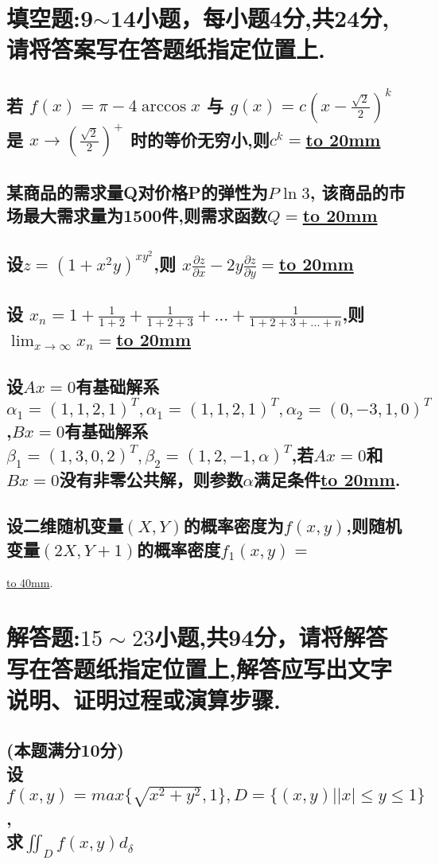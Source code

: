 \documentclass[utf8]{ctexart}
\begin{document}
\section{填空题:\textbf{9$\sim$14小题，每小题4分,共24分,请将答案写在答题纸指定位置上.}}
\subsection{
	若 $f(x)=\pi-4\arccos{x}$ 与 $g(x)=c\left(x-\frac{\sqrt{2}}{2}\right)^k$ 是 $x\rightarrow\left(\frac{\sqrt{2}}{2}\right)^+$ 时的等价无穷小,则$c^k=$\underline{\hbox to 20mm{}} 
}

\subsection{
	某商品的需求量Q对价格P的弹性为$P\ln{3}$, 该商品的市场最大需求量为1500件,则需求函数$Q=$\underline{\hbox to 20mm{}}
}
\subsection{
	设$z=(1+x^2y)^{xy^2}$,则 $x\frac{\partial z}{\partial x} - 2y\frac{\partial z}{\partial y}=$\underline{\hbox to 20mm{}} 
}

\subsection{
	设 $x_n=1+\frac{1}{1+2}+\frac{1}{1+2+3}+\dots+\frac{1}{1+2+3+\dots+n}$,则$\displaystyle\lim_{x \rightarrow \infty}x_n=$\underline{\hbox to 20mm{}}
}
\subsection{
	设$Ax=0$有基础解系$\alpha_1=(1,1,2,1)^T,\alpha_1=(1,1,2,1)^T,\alpha_2=(0,-3,1,0)^T$,$Bx=0$有基础解系$\beta_1=(1,3,0,2)^T,\beta_2=(1,2,-1,\alpha)^T$,若$Ax=0$和$Bx=0$没有非零公共解，则参数$\alpha$满足条件\underline{\hbox to 20mm{}}.
	}
\subsection{设二维随机变量$(X,Y)$的概率密度为$f(x,y)$,则随机变量$(2X,Y+1)$的概率密度$f_1(x,y)=$}\underline{\hbox to 40mm{}}.
\section{解答题:\textmd{$15\sim 23$小题,共94分，请将解答写在答题纸指定位置上,解答应写出文字说明、证明过程或演算步骤.}}
\subsection{
	(本题满分10分)\\
	设$f(x,y)=max\{\sqrt{x^2+y^2},1\},D=\{(x,y)| |x|\leq y\leq 1\}$,\\求$\iint_{D}f(x,y)d_\delta$
}
\end{document}

